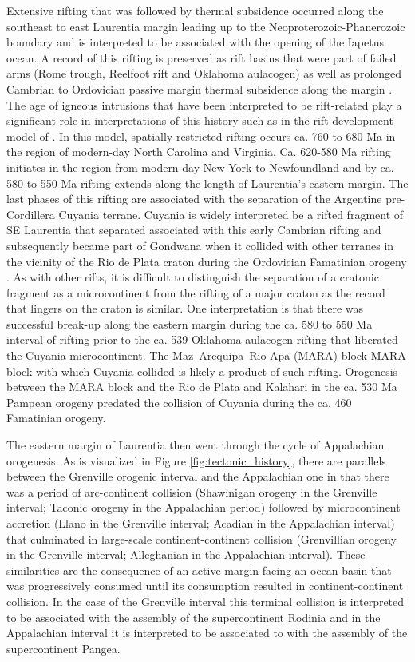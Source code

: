 \documentclass[11pt,letterpaper]{article}
\begin{document}
Extensive rifting that was followed by thermal subsidence occurred along the southeast to east Laurentia margin leading up to the Neoproterozoic-Phanerozoic boundary and is interpreted to be associated with the opening of the Iapetus ocean. A record of this rifting is preserved as rift basins that were part of failed arms (Rome trough, Reelfoot rift and Oklahoma aulacogen) as well as prolonged Cambrian to Ordovician passive margin thermal subsidence along the margin \citep{Bond1984a,Whitmeyer2007a}. The age of igneous intrusions that have been interpreted to be rift-related play a significant role in interpretations of this  history such as in the rift development model of \citet{Burton2010a}. In this model, spatially-restricted rifting occurs ca. 760 to 680 Ma in the region of modern-day North Carolina and Virginia. Ca. 620-580 Ma rifting initiates in the region from modern-day New York to Newfoundland and by ca. 580 to 550 Ma rifting extends along the length of Laurentia's eastern margin. The last phases of this rifting are associated with the separation of the Argentine pre-Cordillera Cuyania terrane. Cuyania is widely interpreted be a rifted fragment of SE Laurentia that separated associated with this early Cambrian rifting and subsequently became part of Gondwana when it collided with other terranes in the vicinity of the Rio de Plata craton during the Ordovician Famatinian orogeny \citep{Martin2019a}. As with other rifts, it is difficult to distinguish the separation of a cratonic fragment as a microcontinent from the rifting of a major craton as the record that lingers on the craton is similar. One interpretation is that there was successful break-up along the eastern margin during the ca. 580 to 550 Ma interval of rifting prior to the ca. 539 Oklahoma aulacogen rifting that liberated the Cuyania microcontinent. The Maz–Arequipa–Rio Apa (MARA) block MARA block with which Cuyania collided \citep{Martin2019a} is likely a product of such rifting. Orogenesis between the MARA block and the Rio de Plata and Kalahari in the ca. 530 Ma Pampean orogeny \citep{Casquet2018a} predated the collision of Cuyania during the ca. 460 Famatinian orogeny. 

The eastern margin of Laurentia then went through the cycle of Appalachian orogenesis. As is visualized in Figure \ref{fig:tectonic_history}, there are parallels between the Grenville orogenic interval and the Appalachian one in that there was a period of arc-continent collision (Shawinigan orogeny in the Grenville interval; Taconic orogeny in the Appalachian period) followed by microcontinent accretion (Llano in the Grenville interval; Acadian in the Appalachian interval) that culminated in large-scale continent-continent collision (Grenvillian orogeny in the Grenville interval; Alleghanian in the Appalachian interval). These similarities are the consequence of an active margin facing an ocean basin that was progressively consumed until its consumption resulted in continent-continent collision. In the case of the Grenville interval this terminal collision is interpreted to be associated with the assembly of the supercontinent Rodinia and in the Appalachian interval it is interpreted to be associated to with the assembly of the supercontinent Pangea.
\end{document}
